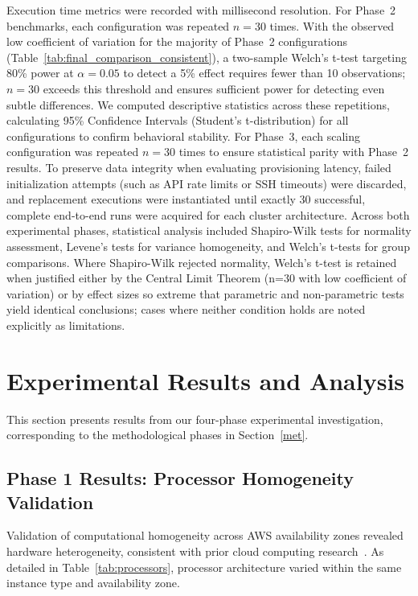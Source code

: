 \documentclass[conference]{IEEEtran}
\begin{document}
Execution time metrics were recorded with millisecond resolution. For Phase~2
benchmarks, each configuration was repeated $n=30$ times. With the observed low coefficient of variation for the majority of Phase~2 configurations (Table~\ref{tab:final_comparison_consistent}),
a two-sample Welch's t-test targeting 80\% power at $\alpha=0.05$ to detect a
5\% effect requires fewer than 10 observations; $n=30$ exceeds this threshold
and ensures sufficient power for detecting even subtle differences. We computed descriptive
statistics across these repetitions, calculating 95\% Confidence Intervals
(Student's t-distribution) for all configurations to confirm behavioral
stability. For Phase~3, each scaling configuration was repeated $n=30$ times
to ensure statistical parity with Phase~2 results. To preserve data integrity
when evaluating provisioning latency, failed initialization attempts (such as
API rate limits or SSH timeouts) were discarded, and replacement executions
were instantiated until exactly 30 successful, complete end-to-end runs were
acquired for each cluster architecture. Across both experimental phases,
statistical analysis included Shapiro-Wilk tests for normality assessment,
Levene's tests for variance homogeneity, and Welch's t-tests for group
comparisons. Where Shapiro-Wilk rejected normality, Welch's t-test is retained
when justified either by the Central Limit Theorem (n=30 with low coefficient
of variation) or by effect sizes so extreme that parametric and non-parametric
tests yield identical conclusions; cases where neither condition holds are noted
explicitly as limitations.

\section{Experimental Results and Analysis}
\label{experiments}

This section presents results from our four-phase experimental investigation,
corresponding to the methodological phases in Section~\ref{met}.

\subsection{Phase 1 Results: Processor Homogeneity Validation}

Validation of computational homogeneity across AWS availability zones revealed
hardware heterogeneity, consistent with prior cloud computing
research~\cite{b5, b6}. As detailed in Table~\ref{tab:processors}, processor
architecture varied within the same instance type and availability zone.
\end{document}
